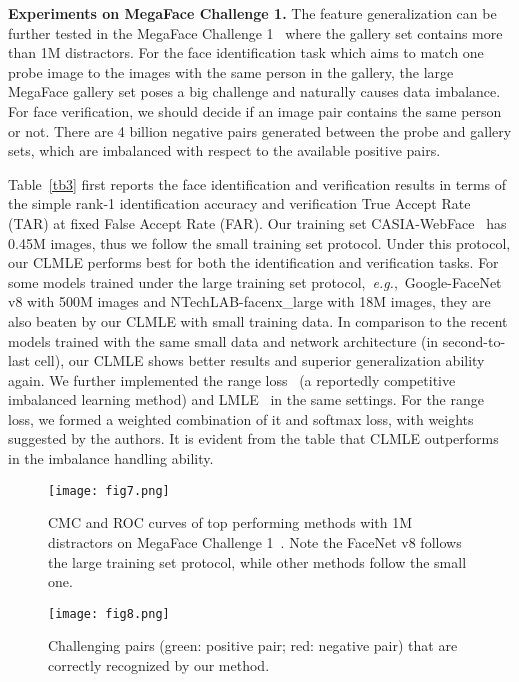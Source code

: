 \documentclass[10pt,journal,compsoc]{IEEEtran}
\newcommand{\eg}{\emph{e.g.}}
\begin{document}
\noindent
{\bf Experiments on MegaFace Challenge 1.} The feature generalization can be further tested in the MegaFace Challenge 1~\cite{kemelmacher2016megaface} where the gallery set contains more than 1M distractors. For the face identification task which aims to match one probe image to the images with the same person in the gallery, the large MegaFace gallery set poses a big challenge and naturally causes data imbalance. For face verification, we should decide if an image pair contains the same person or not. There are 4 billion negative pairs generated between the probe and gallery sets, which are imbalanced with respect to the available positive pairs.

Table~\ref{tb3} first reports the face identification and verification results in terms of the simple rank-1 identification accuracy and verification True Accept Rate (TAR) at fixed False Accept Rate (FAR). Our training set CASIA-WebFace~\cite{YiLLL14a} has 0.45M images, thus we follow the small training set protocol. Under this protocol, our CLMLE performs best for both the identification and verification tasks. For some models trained under the large training set protocol,~\eg,~Google-FaceNet v8 with 500M images and NTechLAB-facenx\_large with 18M images, they are also beaten by our CLMLE with small training data. In comparison to the recent models trained with the same small data and network architecture (in second-to-last cell), our CLMLE shows better results and superior generalization ability again. We further implemented the range loss~\cite{Zhang_8237840} (a reportedly competitive imbalanced learning method) and LMLE~\cite{huang2016lmle} in the same settings. For the range loss, we formed a weighted combination of it and softmax loss, with weights suggested by the authors. It is evident from the table that CLMLE outperforms in the imbalance handling ability.

\begin{figure}[t]
\begin{center}
\texttt{[image: fig7.png]}
\end{center}
\vspace{-1.5em}
\caption{CMC and ROC curves of top performing methods with 1M distractors on MegaFace Challenge 1~\cite{kemelmacher2016megaface}. Note the FaceNet v8 follows the large training set protocol, while other methods follow the small one.}
\vspace{-1em}
\label{fig7}
\end{figure}

\begin{figure}[t]
\begin{center}
\texttt{[image: fig8.png]}
\end{center}
\vspace{-1.5em}
\caption{Challenging pairs (green: positive pair; red: negative pair) that are correctly recognized by our method.}
\vspace{-0.8em}
\label{fig8}
\end{figure}
\end{document}
